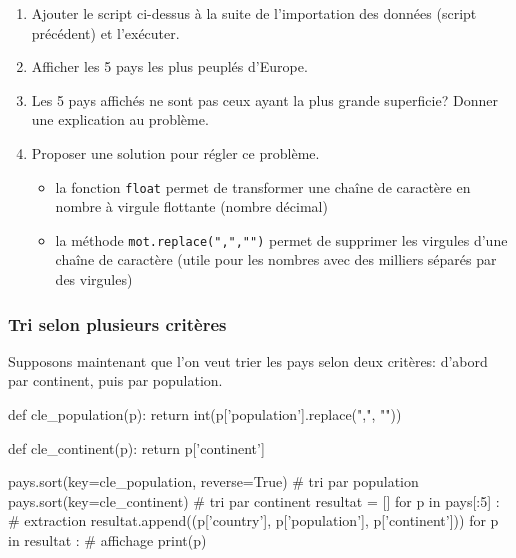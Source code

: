 \begin{exercice_cours}[\quad]{}
\begin{enumerate}
	\item Ajouter le script ci-dessus à la suite de l'importation des données (script précédent) et l'exécuter. 
	\item Afficher les 5 pays les plus peuplés d'Europe.
	\item Les 5 pays affichés ne sont pas ceux ayant la plus grande superficie? Donner une explication au problème.
	\item Proposer une solution pour régler ce problème.

	\begin{remarque}{}
\begin{itemize}
	\item la fonction \verb|float| permet de transformer une chaîne de caractère en nombre à virgule flottante (nombre décimal)
	\item la méthode \verb|mot.replace(",","")| permet de supprimer les virgules d'une chaîne de caractère (utile pour les nombres avec des milliers séparés par des virgules)
\end{itemize}
\end{remarque}
	\end{enumerate}

\end{exercice_cours}
\subsubsection{Tri selon plusieurs critères}

 Supposons maintenant que l'on veut trier les pays selon deux critères: d'abord par continent, puis par population.

\begin{CodePythontexAlt}[TaillePolice=\normalsize, Largeur=1\linewidth,Centre,PremLigne=1, Lignes=false,]{}
def cle_population(p):
    return int(p['population'].replace(",", ""))

def cle_continent(p):
    return p['continent']

pays.sort(key=cle_population, reverse=True)  # tri par population
pays.sort(key=cle_continent)                 # tri par continent
resultat = []
for p in pays[:5] : # extraction
	resultat.append((p['country'], p['population'], p['continent']))
for p in resultat : # affichage
    print(p)
\end{CodePythontexAlt}

\medskip

